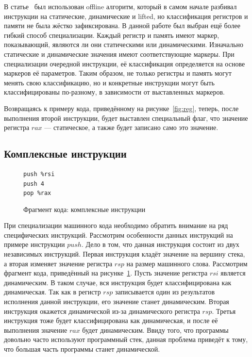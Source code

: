 В статье~\cite{PEMC} был использован offline алгоритм, который в самом начале разбивал инструкции на статические, динамические и lifted, но классификация регистров и памяти не была жёстко зафиксирована. В данной работе был выбран ещё более гибкий способ специализации. Каждый регистр и память имеют маркер, показывающий, являются ли они статическими или динамическими. Изначально статические и динамические значения имеют соответствующие маркеры. При специализации очередной инструкции, её классификация определяется на основе маркеров её параметров. Таким образом, не только регистры и память могут менять свою классификацию, но и конкретные инструкции могут быть классифицированы по-разному, в зависимости от выставленных маркеров.

Возвращаясь к примеру кода, приведённому на рисунке~\ref{fig:reg}, теперь, после выполнения второй инструкции,
будет выставлен специальный флаг, что значение регистра $rax$ --- статическое, а также будет записано само это значение.


\subsection{Комплексные инструкции}
\label{part:4.2}
\begin{figure}
\begin{lstlisting}[xleftmargin = 20pt]
push %rsi
push 4
pop %rax
\end{lstlisting}
\caption{Фрагмент кода: комплексные инструкции}
\label{fig:comp}
\end{figure}
При специализации машинного кода необходимо обратить внимание на ряд специфических инструкций. Рассмотрим особенности данных инструкций на примере инструкции $push$. Дело в том, что данная инструкция состоит из двух независимых инструкций. Первая инструкция кладёт значение на вершину стека, а вторая изменяет значение регистра $rsp$ на размер машинного слова.
Рассмотрим фрагмент кода, приведённый на рисунке~\ref{fig:comp}.
Пусть значение регистра $rsi$ является динамическим.
В таком случае, вся инструкция будет классифицирована как динамическая. Так как в регистр $rsp$ записывается один из результатов исполнения данной инструкции, его значение станет динамическим. Вторая инструкция окажется динамической из-за динамического регистра $rsp$.
Третья инструкция тоже будет классифицирована как  динамическая, и после её выполнения значение $rax$ будет динамическим.
Ввиду того, что программы довольно часто используют программный стек, данная проблема приведёт к тому, что большая часть программы станет динамической.

